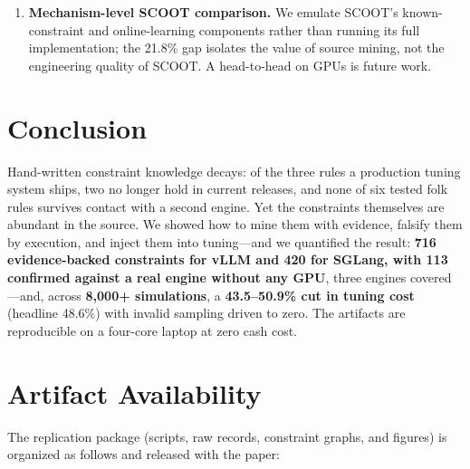 \documentclass[journal]{IEEEtran}
\begin{document}
\begin{enumerate}
  \item \textbf{Mechanism-level SCOOT comparison.} We emulate SCOOT's known-constraint and online-learning components rather than running its full implementation; the 21.8\% gap isolates the value of source mining, not the engineering quality of SCOOT. A head-to-head on GPUs is future work.
\end{enumerate}

\section{Conclusion}

Hand-written constraint knowledge decays: of the three rules a production tuning system ships, two no longer hold in current releases, and none of six tested folk rules survives contact with a second engine. Yet the constraints themselves are abundant in the source. We showed how to mine them with evidence, falsify them by execution, and inject them into tuning---and we quantified the result: \textbf{716 evidence-backed constraints for vLLM and 420 for SGLang, with 113 confirmed against a real engine without any GPU}, three engines covered---and, across \textbf{8{,}000+ simulations}, a \textbf{43.5--50.9\% cut in tuning cost} (headline 48.6\%) with invalid sampling driven to zero. The artifacts are reproducible on a four-core laptop at zero cash cost.

\section{Artifact Availability}
\label{app:artifact}

The replication package (scripts, raw records, constraint graphs, and figures) is organized as follows and released with the paper:
\end{document}
